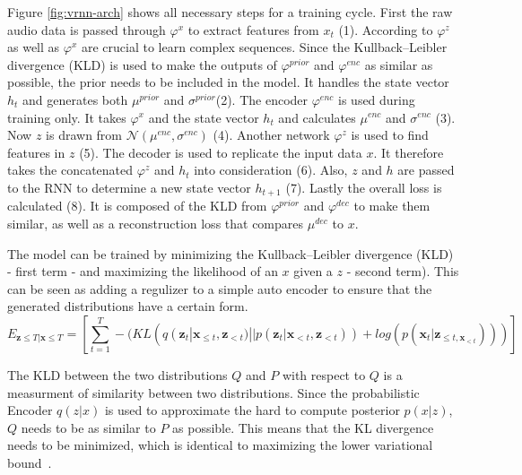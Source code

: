 \documentclass[12pt]{article}
\begin{document}
Figure \ref{fig:vrnn-arch} shows all necessary steps for a training cycle.
First the raw audio data is passed through $\varphi^x$ to extract features from $x_t$ (1).
According to \cite{chung2015recurrent} $\varphi^z$ as well as $\varphi^x$ are crucial to learn complex sequences.
Since the Kullback–Leibler divergence (KLD) is used to make the outputs of $\varphi^{prior}$ and $\varphi^{enc}$ as similar as possible, the prior needs to be included in the model.
It handles the state vector $h_t$ and generates both $\mu^{prior}$ and $\sigma^{prior}$(2).
The encoder $\varphi^{enc}$ is used during training only.
It takes $\varphi^x$ and the state vector $h_t$ and calculates $\mu^{enc}$ and $\sigma^{enc}$ (3).
Now $z$ is drawn from $\mathcal{N}(\mu^{enc}, \sigma^{enc})$ (4).
Another network $\varphi^z$ is used to find features in $z$ (5).
The decoder is used to replicate the input data $x$.
It therefore takes the concatenated $\varphi^z$ and $h_t$ into consideration (6).
Also, $z$ and $h$ are passed to the RNN to determine a new state vector $h_{t+1}$ (7).
Lastly the overall loss is calculated (8).
It is composed of the KLD from $\varphi^{prior}$ and $\varphi^{dec}$ to make them similar, as well as a reconstruction loss that compares $\mu^{dec}$ to $x$. 






The model can be trained by minimizing the Kullback–Leibler divergence (KLD) - first term - and maximizing the likelihood of an $x$ given a $z$ - second term).
This can be seen as adding a regulizer to a simple auto encoder to ensure that the generated distributions have a certain form.
$$
E_{\mathbf{z} \le T | \mathbf{x} \le T} = \left[ \sum_{t=1}^T -(KL(q(\mathbf{z}_t | \mathbf{x}_{\le t}, \mathbf{z}_{<t}) || p(\mathbf{z}_t | \mathbf{x}_{<t}, \mathbf{z}_{<t})) + log(p(\mathbf{x}_t | \mathbf{z}_{\le t, \mathbf{x}_{<t}}))) \right]
$$

The KLD between the two distributions $Q$ and $P$ with respect to $Q$ is a measurment of similarity between two distributions.
Since the probabilistic Encoder $q(z|x)$ is used to approximate the hard to compute posterior $p(x|z)$, $Q$ needs to be as similar to $P$ as possible.
This means that the KL divergence needs to be minimized, which is identical to maximizing the lower variational bound~\cite{kingma2013auto}. 
\end{document}
